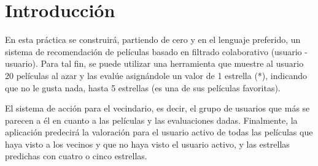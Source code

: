 \chapter{Introducción}

\bigskip 
En esta práctica se construirá, partiendo de cero y en el lenguaje preferido, un sistema de recomendación de películas basado en filtrado colaborativo (usuario - usuario). Para tal fin, se puede utilizar una herramienta que muestre al usuario 20 películas al azar y las evalúe asignándole un valor de 1 estrella (*), indicando que no le gusta nada, hasta 5 estrellas (es una de sus películas favoritas).

\bigskip
El sistema de acción para el vecindario, es decir, el grupo de usuarios que más se parecen a él en cuanto a las películas y las evaluaciones dadas.
\bigskip
Finalmente, la aplicación predecirá la valoración para el usuario activo de todas las películas que haya visto a los vecinos y que no haya visto el usuario activo, y las estrellas predichas con cuatro o cinco estrellas.